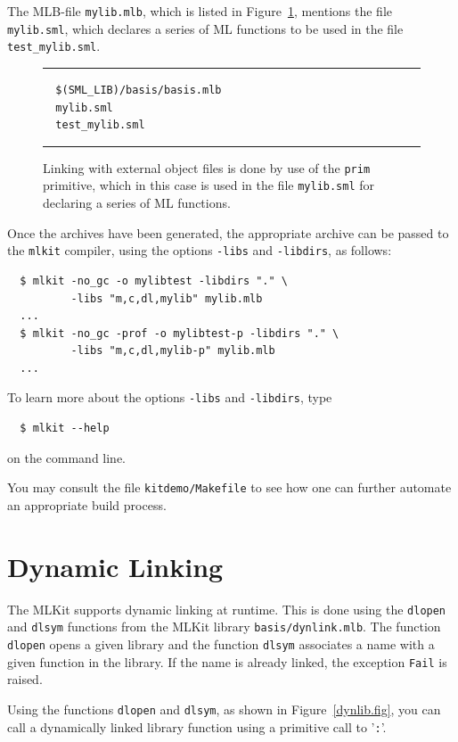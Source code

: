 \documentclass[12pt]{book}
\begin{document}
The MLB-file \verb|mylib.mlb|, which is listed in
Figure~\ref{mylib.mlb.fig}, mentions the file \verb|mylib.sml|, which
declares a series of ML functions to be used in the file
\verb|test_mylib.sml|.
\begin{figure}
\hrule \medskip
\begin{verbatim}
  $(SML_LIB)/basis/basis.mlb
  mylib.sml
  test_mylib.sml
\end{verbatim}
\caption{Linking with external object files is done by use of the
  \texttt{prim} primitive, which in this case is used in the file
  \texttt{mylib.sml} for declaring a series of ML functions.}
\label{mylib.mlb.fig}
\medskip \hrule
\end{figure}

Once the archives have been generated, the appropriate archive can be
passed to the \texttt{mlkit} compiler, using the options
\texttt{-libs} and \texttt{-libdirs}, as follows:
\begin{verbatim}
  $ mlkit -no_gc -o mylibtest -libdirs "." \
          -libs "m,c,dl,mylib" mylib.mlb
  ...
  $ mlkit -no_gc -prof -o mylibtest-p -libdirs "." \
          -libs "m,c,dl,mylib-p" mylib.mlb
  ...
\end{verbatim}

\noindent
To learn more about the options
\texttt{-libs} and \texttt{-libdirs}, type
\begin{verbatim}
  $ mlkit --help
\end{verbatim}
on the command line.

You may consult the file \texttt{kitdemo/Makefile} to see how one can
further automate an appropriate build process.

\section{Dynamic Linking}
\label{link_at_runtime.sec}
The MLKit supports
%
dynamic linking at runtime.  This is done using the
%
\index{dlsym!\texttt{dlsym}}%
\texttt{dlopen} and \texttt{dlsym} functions from the MLKit library
\texttt{basis/dynlink.mlb}. The function \texttt{dlopen} opens a given
library and the function \texttt{dlsym} associates a name with a given
function in the library. If the name is already linked, the exception
\texttt{Fail} is raised.

Using the functions \texttt{dlopen} and \texttt{dlsym}, as shown in
Figure~\ref{dynlib.fig}, you can call a dynamically linked library
function using a primitive call to '\texttt{:}'.
\end{document}
